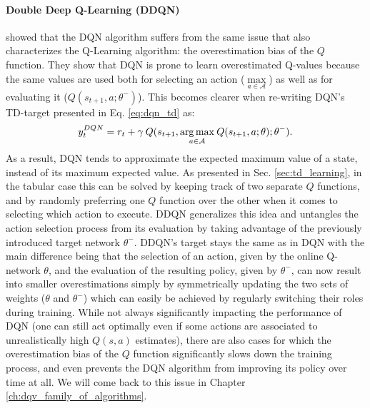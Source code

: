 \paragraph{\textbf{\uppercase{D}ouble \uppercase{D}eep \uppercase{Q}-\uppercase{L}earning (\uppercase{DDQN})}} \citet{van2016deep} showed that the DQN algorithm suffers from the same issue that also characterizes the Q-Learning algorithm: the overestimation bias of the $Q$ function. They show that DQN is prone to learn overestimated Q-values because the same values are used both for selecting an action ($\underset{a\in \mathcal{A}}{\max}$) as well as for evaluating it ($Q(s_{t+1},a;\theta^{-})$). This becomes clearer when re-writing DQN's TD-target presented in Eq. \ref{eq:dqn_td} as:
\begin{equation}
    y^{DQN}_{t} = r_{t} + \gamma \: Q(s_{t+1}, \underset{a\in \mathcal{A}}{\operatorname*{arg\,max}}\: Q(s_{t+1}, a; \theta); \theta^{-}). 
\end{equation}{}
As a result, DQN tends to approximate the expected maximum value of a state, instead of its maximum expected value. As presented in Sec. \ref{sec:td_learning}, in the tabular case this can be solved by keeping track of two separate $Q$ functions, and by randomly preferring one $Q$ function over the other when it comes to selecting which action to execute. DDQN generalizes this idea and untangles the action selection process from its evaluation by taking advantage of the previously introduced target network $\theta^{-}$. DDQN's target stays the same as in DQN with the main difference being that the selection of an action, given by the online Q-network $\theta$, and the evaluation of the resulting policy, given by $\theta^{-}$, can now result into smaller overestimations simply by symmetrically updating the two sets of weights ($\theta$ and $\theta^{-}$) which can easily be achieved by regularly switching their roles during training. While not always significantly impacting the performance of DQN (one can still act optimally even if some actions are associated to unrealistically high $Q(s,a)$ estimates), there are also cases for which the overestimation bias of the $Q$ function significantly slows down the training process, and even prevents the DQN algorithm from improving its policy over time at all. We will come back to this issue in Chapter \ref{ch:dqv_family_of_algorithms}. 


